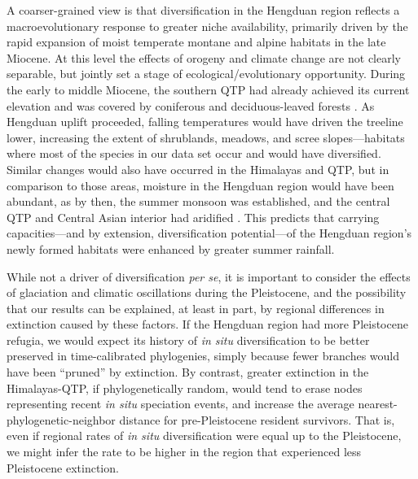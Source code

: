 A coarser-grained view is that diversification in the Hengduan region reflects a macroevolutionary response to greater niche availability, primarily driven by the rapid expansion of moist temperate montane and alpine habitats in the late Miocene. At this level the effects of orogeny and climate change are not clearly separable, but jointly set a stage of ecological/evolutionary opportunity. During the early to middle Miocene, the southern QTP had already achieved its current elevation \citep{Spicer2003} and was covered by coniferous and deciduous-leaved forests \citep{SunJ2014,LiH1976}%
. As Hengduan uplift proceeded, falling temperatures would have driven the treeline lower, increasing the extent of shrublands, meadows, and scree slopes---habitats where most of the species in our data set occur and would have diversified. Similar changes would also have occurred in the Himalayas and QTP, but in comparison to those areas, moisture in the Hengduan region would have been abundant, as by then, the summer monsoon was established, and the central QTP and Central Asian interior had aridified \citep[see][]{Renner2016}. This predicts that carrying capacities---and by extension, diversification potential---of the Hengduan region's newly formed habitats were enhanced by greater summer rainfall. 


While not a driver of diversification \textit{per se}, it is important to consider the effects of glaciation and climatic oscillations during the Pleistocene, and the possibility that our results can be explained, at least in part, by regional differences in extinction caused by these factors. If the Hengduan region had more Pleistocene refugia, we would expect its history of \textit{in situ} diversification to be better preserved in time-calibrated phylogenies, simply because fewer branches would have been ``pruned'' by extinction. By contrast, greater extinction in the Himalayas-QTP, if phylogenetically random, would tend to erase nodes representing recent \textit{in situ} speciation events, and increase the average nearest-phylogenetic-neighbor distance for pre-Pleistocene resident survivors. That is, even if regional rates of \textit{in situ} diversification were equal up to the Pleistocene, we might infer the rate to be higher in the region that experienced less Pleistocene extinction.

